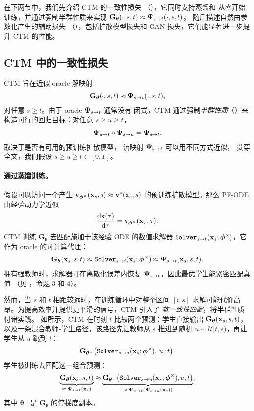 在下两节中，我们先介绍 CTM 的一致性损失
（），它同时支持蒸馏和
从零开始训练，并通过强制半群性质来实现
$\mathbf{G}_{\bm{\theta}}(\cdot, s, t) \approx {\bm{\Psi}}_{s\to t}(\cdot, s, t)$。
随后描述自然由参数化产生的辅助损失
（），包括扩散模型损失和
GAN 损失，它们能显著进一步提升 CTM 的性能。


\subsection{CTM 中的一致性损失}\label{subsec:ctm-consistency}
CTM 旨在近似 oracle 解映射
\[
\mathbf{G}_{\bm{\theta}}(\cdot, s, t) \approx {\bm{\Psi}}_{s\to t}(\cdot, s, t),
\]
对任意 $s \ge t$。由于 oracle ${\bm{\Psi}}_{s\to t}$ 通常没有
闭式，CTM 通过强制\emph{半群性质}（）来构造可行的回归目标：对任意 $s \ge u \ge t$，
\[
{\bm{\Psi}}_{u\to t}\circ {\bm{\Psi}}_{s\to u} = {\bm{\Psi}}_{s\to t}.
\]
取决于是否有可用的预训练扩散模型，
流映射 ${\bm{\Psi}}_{s\to t}$ 可以用不同方式近似。
贯穿全文，我们假设 $s \ge u \ge t \in [0,T]$。


\paragraph{通过蒸馏训练。}
假设可以访问一个产生
${\mathbf{v}}_{\bm{\phi}^\times}({\mathbf{x}}_s, s) \approx {\mathbf{v}}^*({\mathbf{x}}_s, s)$ 的预训练扩散模型。那么
PF-ODE 由经验动力学近似
\begin{align}
\frac{\mathop{}\!\mathrm{d} {\mathbf{x}}(\tau)}{\mathop{}\!\mathrm{d} \tau}
= {\mathbf{v}}_{\bm{\phi}^\times}({\mathbf{x}}_\tau, \tau).
\end{align}
CTM 训练 $\mathbf{G}_{\bm{\theta}}$ 去匹配施加于该经验
ODE 的数值求解器
$\mathtt{Solver}_{s\to t}({\mathbf{x}}_s;\bm{\phi}^\times)$，它作为 oracle 的可计算代理：
\[
\mathbf{G}_{\bm{\theta}}({\mathbf{x}}_s, s, t)
\approx \mathtt{Solver}_{s\to t}({\mathbf{x}}_s;\bm{\phi}^\times)
\approx {\bm{\Psi}}_{s\to t}({\mathbf{x}}_s, s, t).
\]
拥有强教师时，求解器可在离散化误差内恢复 ${\bm{\Psi}}_{s\to t}$，因此最优学生能紧密匹配真值
（见 \citep{kim2023consistency}，命题 3 和 4）。

然而，当 $s$ 和 $t$ 相距较远时，在训练循环中对整个区间 $[t,s]$ 求解可能代价高昂。为提高效率并提供更平滑的信号，CTM 引入了
\emph{软一致性匹配}，将半群性质付诸实践。
如所示，CTM 在时刻
$t$ 比较两个预测：学生直接输出 $\mathbf{G}_{\bm{\theta}}({\mathbf{x}}_s, s, t)$，以及一条混合教师-学生路径，该路径先让教师从 $s$ 推进到随机
$u \sim \mathcal{U}[t,s)$，再让学生从 $u$ 跳到 $t$：
\[
\mathbf{G}_{\bm{\theta}^-} \big(\mathtt{Solver}_{s\to u}({\mathbf{x}}_s;\bm{\phi}^\times),\, u,\, t\big).
\]
学生被训练去匹配这一组合预测：
\begin{align}\label{eq:soft}
\underbrace{\mathbf{G}_{\bm{\theta}}({\mathbf{x}}_s, s, t)}_{\approx\, {\bm{\Psi}}_{s\to t}({\mathbf{x}}_s)}
 \approx
\underbrace{\mathbf{G}_{\bm{\theta}^-} \big(\mathtt{Solver}_{s\to u}({\mathbf{x}}_s;\bm{\phi}^\times), u, t\big)}_{\approx\, {\bm{\Psi}}_{u\to t}({\bm{\Psi}}_{s\to u}({\mathbf{x}}_s))},
\end{align}
其中 $\bm{\theta}^-$ 是 $\mathbf{G}_{\bm{\theta}}$ 的停梯度副本。


